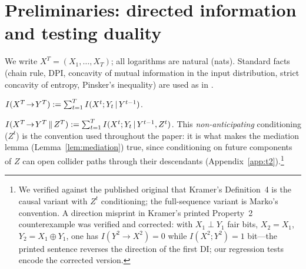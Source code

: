 \section{Preliminaries: directed information and testing duality}
\label{app:prelim}

We write $X^T=(X_1,\dots,X_T)$; all logarithms are natural (nats). Standard
facts (chain rule, DPI, concavity of mutual information in the input
distribution, strict concavity of entropy, Pinsker's inequality) are used as
in \citet{cover_thomas2006}.

\begin{definition}
$I(X^T\!\to\!Y^T):=\sum_{t=1}^T I(X^t;Y_t\,|\, Y^{t-1})$.
\end{definition}

\begin{definition}
$I(X^T\!\to\!Y^T\,\|\,Z^T):=\sum_{t=1}^T I(X^t;Y_t\,|\, Y^{t-1},Z^t)$.
This \emph{non-anticipating} conditioning ($Z^t$) is the convention used
throughout the paper: it is what makes the mediation lemma
(Lemma~\ref{lem:mediation}) true, since conditioning on future components of
$Z$ can open collider paths through their descendants
(Appendix~\ref{app:t2}).\footnote{We verified against the published original
that Kramer's Definition~4 is the causal variant with $Z^t$ conditioning; the
full-sequence variant is Marko's convention. A direction misprint in Kramer's
printed Property~2 counterexample was verified and corrected: with $X_1\perp
Y_1$ fair bits, $X_2=X_1$, $Y_2=X_1\oplus Y_1$, one has
$I(Y^2\!\to\!X^2)=0$ while $I(X^2;Y^2)=1$ bit---the printed sentence reverses
the direction of the first DI; our regression tests encode the corrected
version.}
\end{definition}

